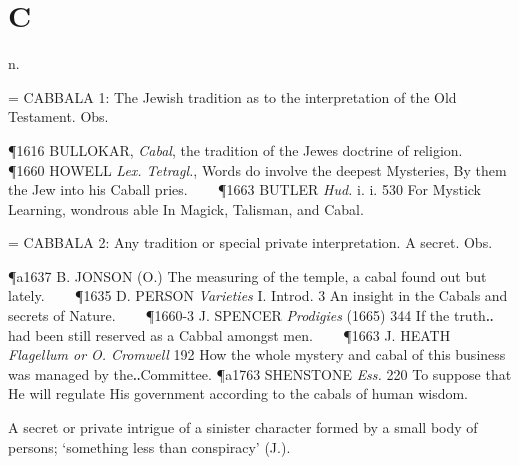 \chapter*{C}
%

\begin{description}[wide, labelwidth=!, labelindent=0pt] %

 n.

\noindent {}

\vspace{-0.3cm}

\begin{myenumerate}

 = CABBALA 1: The Jewish tradition as to the interpretation of the Old Testament. Obs.

\P 1616 BULLOKAR,  \textit{Cabal}, the tradition of the Jewes doctrine of religion.    
\P 1660 HOWELL  \textit{Lex. Tetragl.}, Words do involve the deepest Mysteries, By them the Jew into his Caball pries.    
\P 1663 BUTLER  \textit{Hud.} i. i. 530 For Mystick Learning, wondrous able In Magick, Talisman, and Cabal.

 = CABBALA 2:  Any tradition or special private interpretation.  A secret. Obs.

\P a1637 B. JONSON  (O.) The measuring of the temple, a cabal found out but lately.    
\P 1635 D. PERSON  \textit{Varieties} I. Introd. 3 An insight in the Cabals and secrets of Nature.    
\P 1660-3 J. SPENCER \textit{Prodigies} (1665) 344 If the truth‥had been still reserved as a Cabbal amongst men.    
\P 1663 J. HEATH  \textit{Flagellum or O. Cromwell} 192 How the whole mystery and cabal of this business was managed by the‥Committee.
\P a1763 SHENSTONE  \textit{Ess.} 220 To suppose that He will regulate His government according to the cabals of human wisdom.

 A secret or private intrigue of a sinister character formed by a small body of persons; ‘something less than conspiracy’ (J.).


\end{myenumerate}
\end{description}
